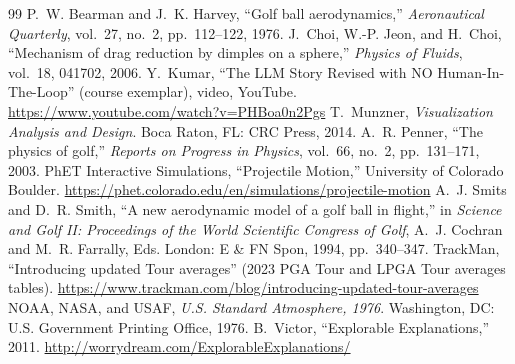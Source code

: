 \documentclass[11pt]{article}
\begin{document}
\begin{thebibliography}{99}\small
{} P.~W. Bearman and J.~K. Harvey, ``Golf ball aerodynamics,''
\emph{Aeronautical Quarterly}, vol.~27, no.~2, pp.~112--122, 1976.
 J.~Choi, W.-P. Jeon, and H.~Choi, ``Mechanism of drag reduction by dimples on a
sphere,'' \emph{Physics of Fluids}, vol.~18, 041702, 2006.
 Y.~Kumar, ``The LLM Story Revised with NO Human-In-The-Loop'' (course exemplar),
video, YouTube. \url{https://www.youtube.com/watch?v=PHBoa0n2Pgs}
 T.~Munzner, \emph{Visualization Analysis and Design}. Boca Raton, FL: CRC
Press, 2014.
 A.~R. Penner, ``The physics of golf,'' \emph{Reports on Progress in Physics},
vol.~66, no.~2, pp.~131--171, 2003.
 PhET Interactive Simulations, ``Projectile Motion,'' University of Colorado Boulder.
\url{https://phet.colorado.edu/en/simulations/projectile-motion}
 A.~J. Smits and D.~R. Smith, ``A new aerodynamic model of a golf ball in
flight,'' in \emph{Science and Golf II: Proceedings of the World Scientific Congress of Golf},
A.~J. Cochran and M.~R. Farrally, Eds. London: E \& FN Spon, 1994, pp.~340--347.
 TrackMan, ``Introducing updated Tour averages'' (2023 PGA Tour and LPGA Tour
averages tables). \url{https://www.trackman.com/blog/introducing-updated-tour-averages}
 NOAA, NASA, and USAF, \emph{U.S. Standard Atmosphere, 1976}. Washington, DC: U.S.
Government Printing Office, 1976.
 B.~Victor, ``Explorable Explanations,'' 2011.
\url{http://worrydream.com/ExplorableExplanations/}
\end{thebibliography}
\end{document}

